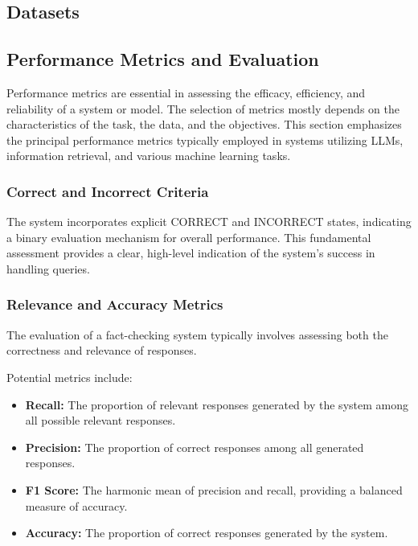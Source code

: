 \subsection{Datasets}\label{subsec:empirical-evaluation:experimental-setup:datasets}

\subsection{Performance Metrics and Evaluation}\label{subsec:empirical-evaluation:experimental-setup:performance-metrics-and-evaluation}
Performance metrics are essential in assessing the efficacy, efficiency, and reliability of a system or model.
The selection of metrics mostly depends on the characteristics of the task, the data, and the objectives.
This section emphasizes the principal performance metrics typically employed in systems utilizing LLMs, information retrieval, and various machine learning tasks.
\subsubsection{Correct and Incorrect Criteria}
The system incorporates explicit CORRECT and INCORRECT states, indicating a binary evaluation mechanism for overall performance.
This fundamental assessment provides a clear, high-level indication of the system's success in handling queries.
\subsubsection{Relevance and Accuracy Metrics}
The evaluation of a fact-checking system typically involves assessing both the correctness and relevance of responses.

Potential metrics include:
\begin{itemize}
    \item \textbf{Recall:} The proportion of relevant responses generated by the system among all possible relevant responses.
    \item \textbf{Precision:} The proportion of correct responses among all generated responses.
    \item \textbf{F1 Score:} The harmonic mean of precision and recall, providing a balanced measure of accuracy.
    \item \textbf{Accuracy:} The proportion of correct responses generated by the system.
\end{itemize}
